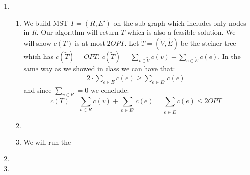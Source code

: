 \documentclass{article}
\begin{document}
\begin{enumerate}
\begin{proof}
\begin{enumerate}[I]
\end{enumerate}	
\end{proof}

\item \begin{enumerate}
	\item We build MST $T = (R,E')$ on the sub graph which includes only nodes in $R$. Our algorithm will return $T$ which is also a feasible solution. We will show $c(T)$ is at most $2OPT$. Let $\tilde T=(\tilde V,\tilde E)$ be the steiner tree which has $c(\tilde T)=OPT$. $c(\tilde T) = \sum_{v\in \tilde V} c(v) + \sum_{e\in \tilde E} c(e)$. In the same way as we showed in class we can have that:
	\begin{align*}
		2 \cdot \sum_{e\in \tilde E} c(e) \ge \sum_{e\in E'} c(e)
	\end{align*}
	 and since $\sum_{v\in R} = 0$ we conclude:
	 $$c(T) = \sum_{v\in R} c(v) + \sum_{e\in E'} c(e) = \sum_{e\in \tilde E} c(e) \le 2OPT$$
	\item
	\item We will run the 
\end{enumerate}
\item 
\item 
\end{enumerate}
\end{document}
